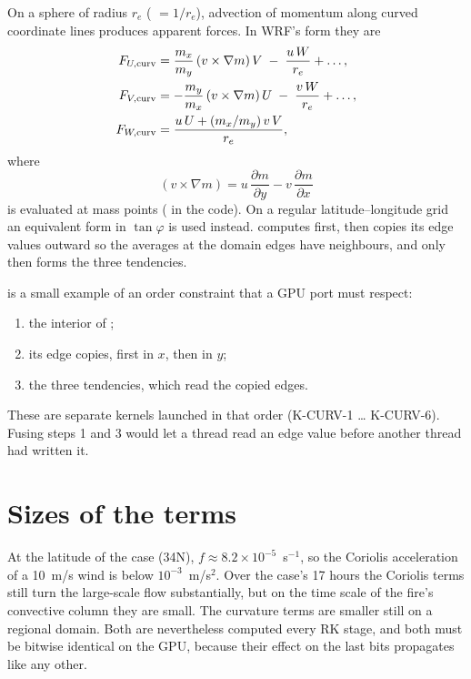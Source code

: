 On a sphere of radius $r_e$ ( $= 1/r_e$), advection of momentum along curved coordinate lines produces
apparent forces. In WRF's form they are
\begin{align}
  F_{U,\mathrm{curv}} &= \frac{m_x}{m_y}\,(v\times\nabla m)\,V \;-\; \frac{u\,W}{r_e} + \dots, \notag\\
  F_{V,\mathrm{curv}} &= -\frac{m_y}{m_x}\,(v\times\nabla m)\,U \;-\; \frac{v\,W}{r_e} + \dots,\\
  F_{W,\mathrm{curv}} &= \frac{u\,U + (m_x/m_y)\,v\,V}{r_e}, \notag
\end{align}
where
\begin{equation}
  (v\times\nabla m) = u\,\frac{\partial m}{\partial y} - v\,\frac{\partial m}{\partial x}
\end{equation}
is evaluated at mass points ( in the code). On a regular latitude--longitude grid an equivalent form in
$\tan\varphi$ is used instead.  computes  first, then copies its edge values outward so the
averages at the domain edges have neighbours, and only then forms the three tendencies.

\begin{portnote}
 is a small example of an order constraint that a GPU port must respect:
\begin{enumerate}
  \item the interior of ;
  \item its edge copies, first in $x$, then in $y$;
  \item the three tendencies, which read the copied edges.
\end{enumerate}
These are separate kernels launched in that order (K-CURV-1 \dots{} K-CURV-6). Fusing steps 1 and 3 would let a thread
read an edge value before another thread had written it.
\end{portnote}

\section{Sizes of the terms}

At the latitude of the case (34\textdegree{}N), $f \approx 8.2\times10^{-5}$~s$^{-1}$, so the Coriolis acceleration of
a 10~m/s wind is below $10^{-3}$~m/s$^2$. Over the case's 17 hours the Coriolis terms still turn the large-scale flow
substantially, but on the time scale of the fire's convective column they are small. The curvature terms are smaller
still on a regional domain. Both are nevertheless computed every RK stage, and both must be bitwise identical on the
GPU, because their effect on the last bits propagates like any other.
